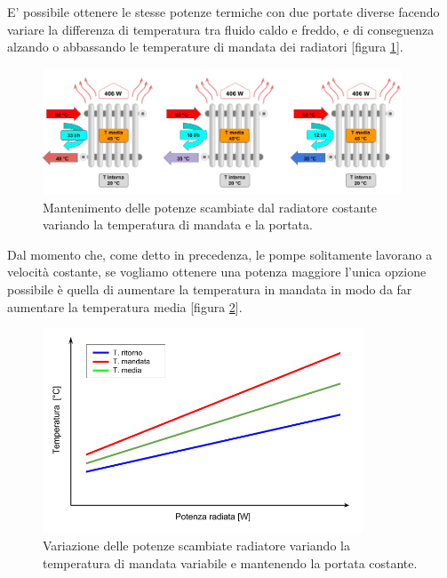 \documentclass[laurea,oneside,11pt]{USiena_tesiLM}
\begin{document}
E' possibile ottenere  le stesse potenze termiche con due portate diverse facendo variare la differenza di temperatura tra fluido caldo e freddo, e di conseguenza alzando o abbassando le temperature di mandata dei radiatori [figura \ref{fig:portata}]. 

\begin{figure}[h]
\begin{center}
\includegraphics[width=0.95\textwidth]{figure/portata} %
\caption{Mantenimento delle potenze scambiate dal radiatore costante variando la temperatura di mandata e la portata.}
\label{fig:portata}
\end{center}
\end{figure}

Dal momento che, come detto in precedenza, le pompe solitamente lavorano a velocità costante, se vogliamo ottenere una potenza maggiore l'unica opzione possibile è quella di aumentare la temperatura in mandata in modo da far aumentare la temperatura media [figura \ref{fig:portata2}].

\begin{figure}[!ht]
\begin{center}
\includegraphics[width=0.85\textwidth]{figure/pot_radiatore} %
\caption{Variazione delle potenze scambiate radiatore variando la temperatura di mandata variabile e mantenendo la portata costante.}
\label{fig:portata2}
\end{center}
\end{figure}
\end{document}
